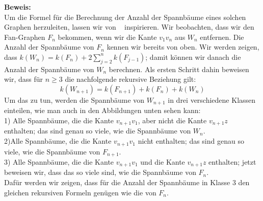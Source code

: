 \textbf{Beweis:}\\
Um die Formel für die Berechnung der Anzahl der Spannbäume eines solchen Graphen herzuleiten, lassen wir von ~\cite{sedlacek_1970} inspirieren.
Wir beobachten, dass wir den Fan-Graphen $F_n$ bekommen, wenn wir die Kante $v_1v_n$ aus $W_n$ entfernen.
Die Anzahl der Spannbäume von $F_n$ kennen wir bereits von oben.
Wir werden zeigen, dass $\mathit{k}(W_n) = \mathit{k}(F_n) + 2 \sum_{j=2}^n\mathit{k}(F_{j-1})$;
damit können wir danach die Anzahl der Spannbäume von $W_n$ berechnen.
Als ersten Schritt dahin beweisen wir, dass für $n \geq 3$ die nachfolgende rekursive Beziehung gilt:
\begin{equation}
 \mathit{k}(W_{n+1}) = \mathit{k}(F_{n+1}) + \mathit{k}(F_n) + \mathit{k}(W_n)
\end{equation}
Um das zu tun, werden die Spannbäume von $W_{n+1}$ in drei verschiedene Klassen einteilen, wie man auch in den Abbildungen unten sehen kann:\\%
1) Alle Spannbäume, die die Kante $v_{n+1}v_1$, aber nicht die Kante $v_{n+1}z$ enthalten; das sind genau so viele, wie die Spannbäume von $W_n$. \\%
2)Alle Spannbäume, die die Kante $v_{n+1}v_1$ nicht enthalten; das sind genau so viele, wie die Spannbäume von $F_{n+1}$.\\%
3) Alle Spannbäume, die die Kante $v_{n+1}v_1$ und die Kante $v_{n+1}z$ enthalten; jetzt beweisen wir, dass das so viele sind, wie die Spannbäume von $F_n$.\\
Dafür werden wir zeigen, dass für die Anzahl der Spannbäume in Klasse $3$ den gleichen rekursiven Formeln genügen wie die von $F_n$.\\
